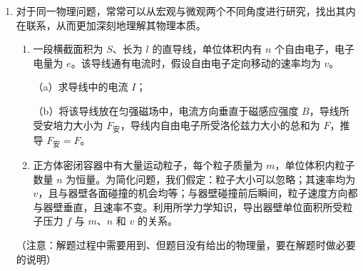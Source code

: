 \documentclass[\gkver]{gaokaozhenti}
\begin{document}
\begin{enumerate}
{\begin{enumerate}
\end{enumerate}
}

\item
对于同一物理问题，常常可以从宏观与微观两个不同角度进行研究，找出其内在联系，从而更加深刻地理解其物理本质。
\begin{enumerate}
	\item
	一段横截面积为 $S$、长为 $l$ 的直导线，单位体积内有 $n$ 个自由电子，电子电量为 $e$。该导线通有电流时，假设自由电子定向移动的速率均为 $v$。

	（a）求导线中的电流 $I$；

	（b）将该导线放在匀强磁场中，电流方向垂直于磁感应强度 $B$，导线所受安培力大小为 $F_{\text{安}}$，导线内自由电子所受洛伦兹力大小的总和为 $F$，推导 $F_{\text{安}}=F$。

	\item
	正方体密闭容器中有大量运动粒子，每个粒子质量为 $m$，单位体积内粒子数量 $n$ 为恒量。为简化问题，我们假定：粒子大小可以忽略；其速率均为 $v$，且与器壁各面碰撞的机会均等；与器壁碰撞前后瞬间，粒子速度方向都与器壁垂直，且速率不变。利用所学力学知识，导出器壁单位面积所受粒子压力 $f$ 与 $m$、$n$ 和 $v$ 的关系。
\end{enumerate}

（注意：解题过程中需要用到、但题目没有给出的物理量，要在解题时做必要的说明）
\end{enumerate}
\end{document}
